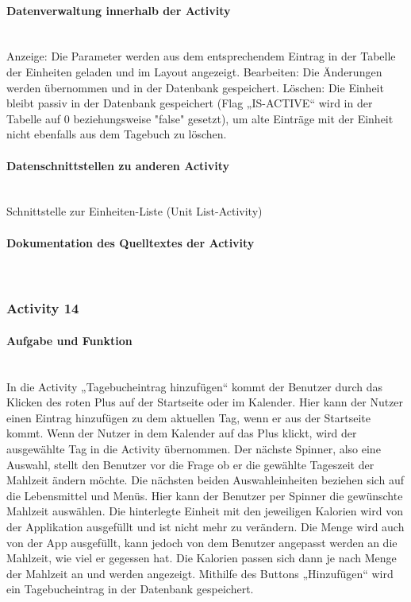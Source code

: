 \paragraph{Datenverwaltung innerhalb der Activity}\\
Anzeige: Die Parameter werden aus dem entsprechendem Eintrag in der Tabelle der Einheiten geladen und im Layout angezeigt. 
Bearbeiten: Die Änderungen werden übernommen und in der Datenbank gespeichert. 
Löschen: Die Einheit bleibt passiv in der Datenbank gespeichert (Flag „IS-ACTIVE“ wird in der Tabelle auf 0 beziehungsweise "false" gesetzt), um alte Einträge mit der Einheit nicht ebenfalls aus dem Tagebuch zu löschen.

\paragraph{Datenschnittstellen zu anderen Activity}\\
Schnittstelle zur Einheiten-Liste (Unit List-Activity)

\paragraph{Dokumentation des Quelltextes der Activity}\\

\subsubsection{Activity 14}

\paragraph{Aufgabe und Funktion}\\
In die Activity „Tagebucheintrag hinzufügen“ kommt der Benutzer durch das Klicken des roten Plus auf der Startseite oder im Kalender. Hier kann der Nutzer einen Eintrag hinzufügen zu dem aktuellen Tag, wenn er aus der Startseite kommt. Wenn der Nutzer in dem Kalender auf das Plus klickt, wird der ausgewählte Tag in die Activity übernommen. Der nächste Spinner, also eine Auswahl, stellt den Benutzer vor die Frage ob er die gewählte Tageszeit der Mahlzeit ändern möchte.
Die nächsten beiden Auswahleinheiten beziehen sich auf die Lebensmittel und Menüs. Hier kann der Benutzer per Spinner die gewünschte Mahlzeit auswählen. Die hinterlegte Einheit mit den jeweiligen Kalorien wird von der Applikation ausgefüllt und ist nicht mehr zu verändern. Die Menge wird auch von der App ausgefüllt, kann jedoch von dem Benutzer angepasst werden an die Mahlzeit, wie viel er gegessen hat. Die Kalorien passen sich dann je nach Menge der Mahlzeit an und werden angezeigt. Mithilfe des Buttons „Hinzufügen“ wird ein Tagebucheintrag in der Datenbank gespeichert.
